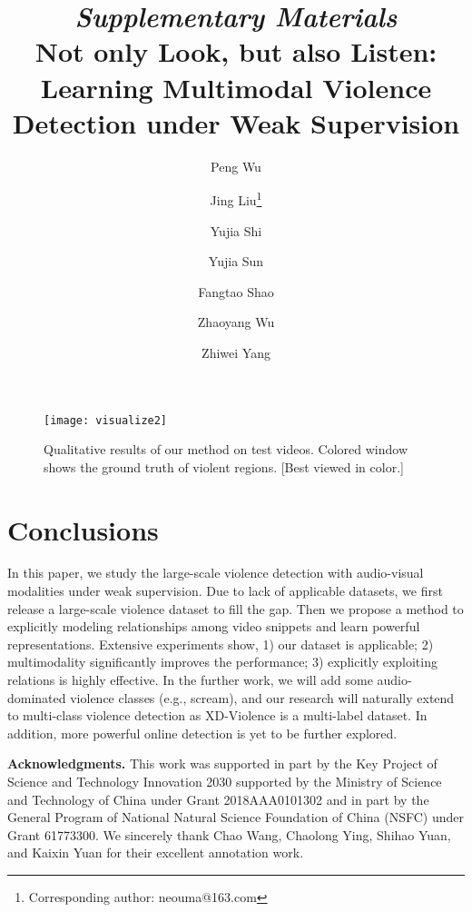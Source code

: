 \documentclass[runningheads]{llncs}
\begin{document}
\begin{figure}[t]
\centering
\texttt{[image: visualize2]}
\caption{Qualitative results of our method on test videos. Colored window shows the ground truth of violent regions. [Best viewed in color.]}
\label{fig:visualize}
\end{figure}
\section{Conclusions}
In this paper, we study the large-scale violence detection with audio-visual modalities under weak supervision. Due to lack of applicable datasets, we first release a large-scale violence dataset to fill the gap. Then we propose a method to explicitly modeling relationships among video snippets and learn powerful representations. Extensive experiments show, 1) our dataset is applicable; 2) multimodality significantly improves the performance; 3) explicitly exploiting relations is highly effective. In the further work, we will add some audio-dominated violence classes (e.g., scream), and our research will naturally extend to multi-class violence detection as XD-Violence is a multi-label dataset. In addition, more powerful online detection is yet to be further explored.

\noindent\textbf{Acknowledgments.} This work was supported in part by the Key Project of Science and Technology Innovation 2030 supported by the Ministry of Science and Technology of China under Grant 2018AAA0101302 and in part by the General Program of National Natural Science Foundation of China (NSFC) under Grant 61773300. We sincerely thank Chao Wang, Chaolong Ying, Shihao Yuan, and Kaixin Yuan for their excellent annotation work.








\pagestyle{headings}
\mainmatter
\def\ECCVSubNumber{7476}  

\title{\textit{Supplementary Materials}\\Not only Look, but also Listen: Learning Multimodal Violence Detection under Weak Supervision 
} 

\begin{comment}
\titlerunning{ECCV-20 submission ID \ECCVSubNumber} 
\authorrunning{ECCV-20 submission ID \ECCVSubNumber} 
\author{Anonymous ECCV submission}
\institute{Paper ID \ECCVSubNumber}
\end{comment}


\author{Peng Wu \and
Jing Liu\thanks{Corresponding author: neouma@163.com}  \and
Yujia Shi \and
Yujia Sun \and
Fangtao Shao \and
Zhaoyang Wu \and
Zhiwei Yang}
\end{document}
